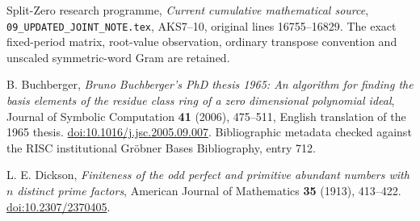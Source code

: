 Split-Zero research programme,
\emph{Current cumulative mathematical source},
\texttt{09\_UPDATED\_JOINT\_NOTE.tex}, AKS7--10,
original lines 16755--16829.
The exact fixed-period matrix, root-value observation, ordinary
transpose convention and unscaled symmetric-word Gram are retained.

B. Buchberger,
\emph{Bruno Buchberger's PhD thesis 1965:
An algorithm for finding the basis elements of the residue class ring
of a zero dimensional polynomial ideal},
Journal of Symbolic Computation \textbf{41} (2006), 475--511,
English translation of the 1965 thesis.
\href{https://doi.org/10.1016/j.jsc.2005.09.007}
{doi:10.1016/j.jsc.2005.09.007}.
Bibliographic metadata checked against the RISC institutional
Gr\"obner Bases Bibliography, entry 712.

L. E. Dickson,
\emph{Finiteness of the odd perfect and primitive abundant numbers
with \(n\) distinct prime factors},
American Journal of Mathematics \textbf{35} (1913), 413--422.
\href{https://doi.org/10.2307/2370405}{doi:10.2307/2370405}.
